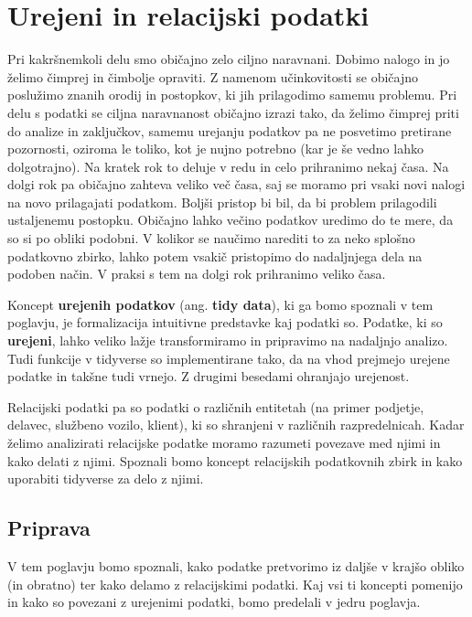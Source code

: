 \documentclass[
]{book}
\begin{document}
\hypertarget{urejeni-in-relacijski-podatki}{%
\chapter{Urejeni in relacijski podatki}\label{urejeni-in-relacijski-podatki}}

Pri kakršnemkoli delu smo običajno zelo ciljno naravnani. Dobimo nalogo in jo želimo čimprej in čimbolje opraviti. Z namenom učinkovitosti se običajno poslužimo znanih orodij in postopkov, ki jih prilagodimo samemu problemu. Pri delu s podatki se ciljna naravnanost običajno izrazi tako, da želimo čimprej priti do analize in zaključkov, samemu urejanju podatkov pa ne posvetimo pretirane pozornosti, oziroma le toliko, kot je nujno potrebno (kar je še vedno lahko dolgotrajno). Na kratek rok to deluje v redu in celo prihranimo nekaj časa. Na dolgi rok pa običajno zahteva veliko več časa, saj se moramo pri vsaki novi nalogi na novo prilagajati podatkom. Boljši pristop bi bil, da bi problem prilagodili ustaljenemu postopku. Običajno lahko večino podatkov uredimo do te mere, da so si po obliki podobni. V kolikor se naučimo narediti to za neko splošno podatkovno zbirko, lahko potem vsakič pristopimo do nadaljnjega dela na podoben način. V praksi s tem na dolgi rok prihranimo veliko časa.

Koncept \textbf{urejenih podatkov} (ang. \textbf{tidy data}), ki ga bomo spoznali v tem poglavju, je formalizacija intuitivne predstavke kaj podatki so. Podatke, ki so \textbf{urejeni}, lahko veliko lažje transformiramo in pripravimo na nadaljnjo analizo. Tudi funkcije v tidyverse so implementirane tako, da na vhod prejmejo urejene podatke in takšne tudi vrnejo. Z drugimi besedami ohranjajo urejenost.

Relacijski podatki pa so podatki o različnih entitetah (na primer podjetje, delavec, službeno vozilo, klient), ki so shranjeni v različnih razpredelnicah. Kadar želimo analizirati relacijske podatke moramo razumeti povezave med njimi in kako delati z njimi. Spoznali bomo koncept relacijskih podatkovnih zbirk in kako uporabiti tidyverse za delo z njimi.

\hypertarget{priprava-1}{%
\section{Priprava}\label{priprava-1}}

V tem poglavju bomo spoznali, kako podatke pretvorimo iz daljše v krajšo obliko (in obratno) ter kako delamo z relacijskimi podatki. Kaj vsi ti koncepti pomenijo in kako so povezani z urejenimi podatki, bomo predelali v jedru poglavja.
\end{document}
